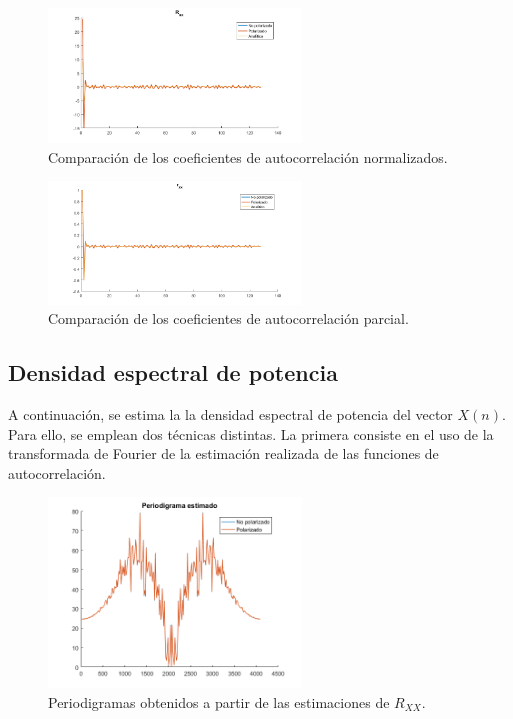 \begin{figure}[H]
\centering
	\includegraphics[width=0.6\textwidth, trim = {0 0 0 0.7cm},clip]{./ImagenesEjercicio2/Rxxcalc.png}
	\caption{Comparación de los coeficientes de autocorrelación normalizados.}
	\label{fig:Rxxcalc}
\end{figure}
\begin{figure}[H]
\centering
	\includegraphics[width=0.6\textwidth, trim = {0 0 0 0.7cm},clip]{./ImagenesEjercicio2/rrxxcalc.png}
	\caption{Comparación de los coeficientes de autocorrelación parcial.}
	\label{fig:rrxxcalc2}
\end{figure}


\subsection{Densidad espectral de potencia}

A continuación, se estima la la densidad espectral de potencia del vector $X(n)$. Para ello, se emplean dos técnicas distintas. La primera consiste en el uso de la transformada de Fourier de la estimación realizada de las funciones de autocorrelación.
\begin{figure}[H]
\centering
	\includegraphics[width=0.6\textwidth, trim = {0 0 0 0.725cm},clip]{./ImagenesEjercicio2/period-est.png}
	\caption{Periodigramas obtenidos a partir de las estimaciones de $R_{XX}$.}
	\label{fig:period-est}
\end{figure}

